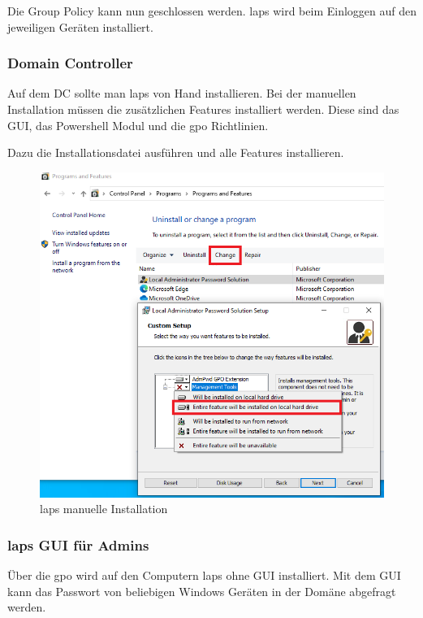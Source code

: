 Die Group Policy kann nun geschlossen werden.
\acrshort{laps} wird beim Einloggen auf den jeweiligen Geräten installiert.

\subsubsection{Domain Controller}
Auf dem DC sollte man \acrshort{laps} von Hand installieren.
Bei der manuellen Installation müssen die zusätzlichen Features installiert werden.
Diese sind das GUI, das Powershell Modul und die \acrshort{gpo} Richtlinien.

Dazu die Installationsdatei ausführen und alle Features installieren.
\begin{figure}[H]
    \centering
    \includegraphics[width=0.7\linewidth]{../img/LAPS/laps-ui-install-2.png}
    \caption{\acrshort{laps} manuelle Installation}
\end{figure}


\subsubsection{\acrshort{laps} GUI für Admins}\label{subsubsec:Laps-Gui}
Über die \acrshort{gpo} wird auf den Computern \acrshort{laps} ohne GUI installiert.
Mit dem GUI kann das Passwort von beliebigen Windows Geräten in der Domäne abgefragt werden.\\


